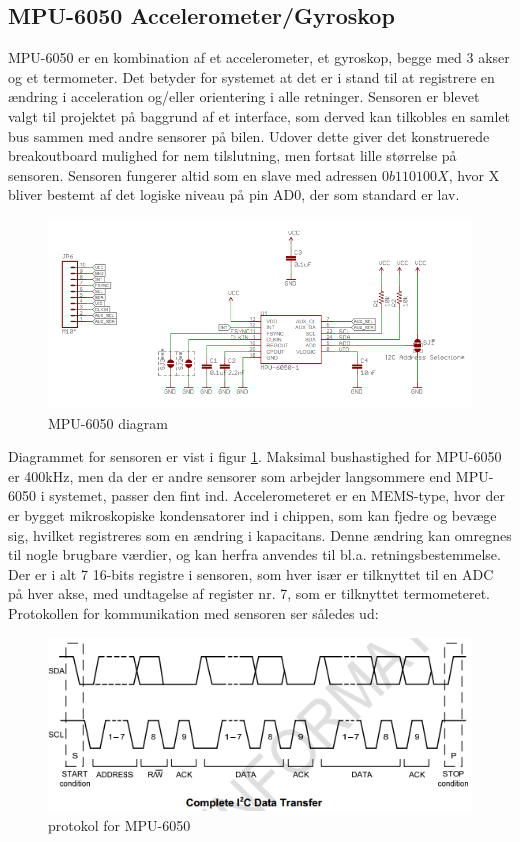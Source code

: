 \subsection{MPU-6050 Accelerometer/Gyroskop}

MPU-6050 er en kombination af et accelerometer, et gyroskop, begge med 3 akser og et termometer. Det betyder for systemet at det er i stand til at registrere en ændring i acceleration og/eller orientering i alle retninger. Sensoren er blevet valgt til projektet på baggrund af et \IIC interface, som derved kan tilkobles en samlet bus sammen med andre sensorer på bilen. Udover dette giver det konstruerede breakoutboard mulighed for nem tilslutning, men fortsat lille størrelse på sensoren.
Sensoren fungerer altid som en slave med adressen $0b110100X$, hvor X bliver bestemt af det logiske niveau på pin AD0, der som standard er lav. 

\begin{figure}[h]
	\centering
	\includegraphics[scale=0.7]{../fig/diagrammer/mpu6050.png}
	\caption{MPU-6050 diagram}
	\label{fig:mpu6050}
\end{figure}

Diagrammet for sensoren er vist i figur \ref{fig:mpu6050}. Maksimal bushastighed for MPU-6050 er 400kHz, men da der er andre sensorer som arbejder langsommere end MPU-6050 i systemet, passer den fint ind. Accelerometeret er en MEMS-type, hvor der er bygget mikroskopiske kondensatorer ind i chippen, som kan fjedre og bevæge sig, hvilket registreres som en ændring i kapacitans. Denne ændring kan omregnes til nogle brugbare værdier, og kan herfra anvendes til bl.a. retningsbestemmelse. Der er i alt 7 16-bits registre i sensoren, som hver især er tilknyttet til en ADC på hver akse, med undtagelse af register nr. 7, som er tilknyttet termometeret. 
Protokollen for kommunikation med sensoren ser således ud:

\begin{figure}[h]
	\centering
	\includegraphics[scale=0.8]{../fig/billeder/mpu6050i2c.png}
	\caption{\IIC protokol for MPU-6050}
	\label{fig:mpu6050i2c}
\end{figure}

